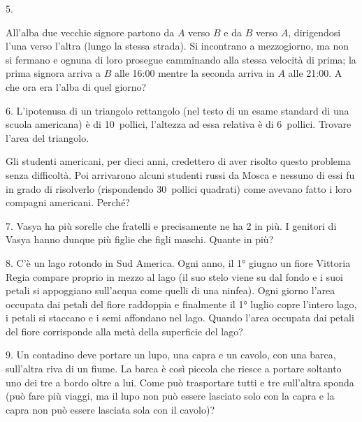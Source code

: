 \begin{problem}{5.}
	
All’alba due vecchie signore  partono da $A$ verso $B$ e da $B$ verso $A$, dirigendosi l’una verso l’altra (lungo la stessa strada). Si incontrano a mezzogiorno, ma non si fermano e ognuna di loro prosegue camminando alla stessa velocità di prima; la prima signora arriva a $B$ alle 16:00 mentre la seconda arriva in $A$ alle 21:00. A che ora era l’alba di quel giorno?

\end{problem}

\begin{problem}{6.}
	L’ipotenusa di un triangolo rettangolo (nel testo di un esame standard di una scuola americana) è di 10~pollici, l’altezza ad essa relativa è di 6~pollici. Trovare l’area del triangolo.

Gli studenti americani, per dieci anni, credettero di aver risolto questo problema senza difficoltà. Poi arrivarono alcuni studenti russi da Mosca e nessuno di essi fu in grado di risolverlo (rispondendo 30~pollici quadrati) come avevano fatto i loro compagni americani. Perché?
\end{problem}

\begin{problem}{7.}
	Vasya ha più sorelle che fratelli e precisamente ne ha 2 in più. I genitori di Vasya hanno dunque più figlie che figli maschi. Quante in più?
\end{problem}

\begin{problem}{8.}
	C’è un lago rotondo in Sud America. Ogni anno, il 1° giugno un fiore Vittoria Regia compare proprio in mezzo al lago (il suo stelo viene su dal fondo e i suoi petali si appoggiano sull’acqua come quelli di una ninfea). Ogni giorno l’area occupata dai petali del fiore raddoppia e finalmente il 1° luglio  copre l’intero lago,  i petali si staccano e i semi affondano nel lago. Quando l’area occupata dai petali del fiore corrisponde alla metà della superficie del lago?
\end{problem}

\begin{problem}{9.}
	Un contadino deve portare un lupo, una capra e un cavolo, con una barca, sull’altra riva di un fiume. La barca è così piccola che riesce a portare soltanto uno dei tre a bordo oltre a lui. Come può trasportare tutti e tre sull’altra sponda (può fare più viaggi, ma il lupo non può essere lasciato solo con la capra e la capra non può essere lasciata sola con il cavolo)?
\end{problem}

